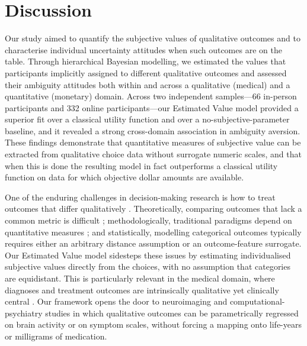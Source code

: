 \documentclass[11pt]{article}
\begin{document}
\section{Discussion}

Our study aimed to quantify the subjective values of qualitative outcomes and to characterise individual uncertainty attitudes when such outcomes are on the table. Through hierarchical Bayesian modelling, we estimated the values that participants implicitly assigned to different qualitative outcomes and assessed their ambiguity attitudes both within and across a qualitative (medical) and a quantitative (monetary) domain. Across two independent samples---66 in-person participants and 332 online participants---our Estimated Value model provided a superior fit over a classical utility function and over a no-subjective-parameter baseline, and it revealed a strong cross-domain association in ambiguity aversion. These findings demonstrate that quantitative measures of subjective value can be extracted from qualitative choice data without surrogate numeric scales, and that when this is done the resulting model in fact outperforms a classical utility function on data for which objective dollar amounts are available.

One of the enduring challenges in decision-making research is how to treat outcomes that differ qualitatively \citep{bijlenga2007balance,basu2018vio}. Theoretically, comparing outcomes that lack a common metric is difficult \citep{trimmer2011bayesians}; methodologically, traditional paradigms depend on quantitative measures \citep{levy2012measuring}; and statistically, modelling categorical outcomes typically requires either an arbitrary distance assumption or an outcome-feature surrogate. Our Estimated Value model sidesteps these issues by estimating individualised subjective values directly from the choices, with no assumption that categories are equidistant. This is particularly relevant in the medical domain, where diagnoses and treatment outcomes are intrinsically qualitative yet clinically central \citep{james2017prostate}. Our framework opens the door to neuroimaging and computational-psychiatry studies in which qualitative outcomes can be parametrically regressed on brain activity or on symptom scales, without forcing a mapping onto life-years or milligrams of medication.
\end{document}
